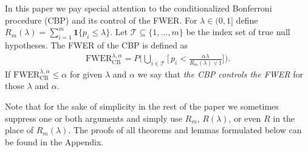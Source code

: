 \documentclass {imsart}
\renewcommand{\emph}[1]{\textsl{#1}}
\newcommand{\FWER}{\text{$\mathrm{FWER}$}}
\renewcommand{\P}{\mathcal{P}}
\newcommand{\Plam}{\mathcal{P}^\lambda}
\begin{document}






In this paper we pay special attention to the conditionalized Bonferroni procedure (CBP) and its control of the FWER. For $\lambda\in(0,1]$ define $R_m(\lambda)=\sum_{i=1}^m\boldsymbol{1}\{p_i\le\lambda\}$. Let $\mathcal{T}\subseteq\{1,\ldots,m\}$ be the index set of true null hypotheses. The FWER of the CBP is defined as
\begin{align*}
\FWER_{\text{CB}}^{\lambda,\alpha}=P\Big(\bigcup\limits_{i\in\mathcal{T}}{\Big[\,p_i<\frac{\alpha \lambda }{R_m(\lambda) \vee 1}}\Big]\Big).
\end{align*}
If $\FWER_{\text{CB}}^{\lambda,\alpha}\le\alpha$ for given $\lambda$ and $\alpha$ we say that \emph{the CBP controls the FWER}
for those $\lambda$ and $\alpha$.

Note that for the sake of simplicity in the rest of the paper we sometimes suppress one or both arguments and simply use $R_m$, $R(\lambda)$, or even $R$ in the place of $R_m(\lambda)$. The proofs of all theorems and lemmas formulated below can be found in the Appendix.
\end{document}
